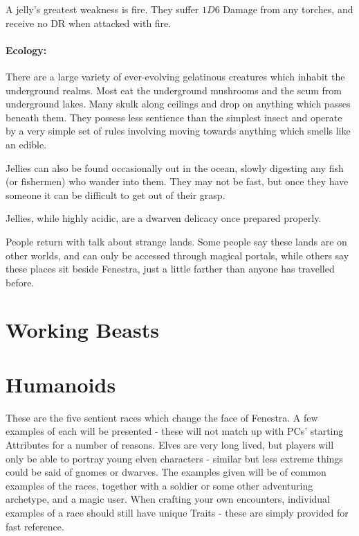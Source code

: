 A jelly's greatest weakness is fire.  They suffer $1D6$ Damage from any torches, and receive no DR when attacked with fire.

\paragraph{Ecology:} There are a large variety of ever-evolving gelatinous creatures which inhabit the underground realms.  Most eat the underground mushrooms and the scum from underground lakes.  Many skulk along ceilings and drop on anything which passes beneath them.  They possess less sentience than the simplest insect and operate by a very simple set of rules involving moving towards anything which smells like an edible.

Jellies can also be found occasionally out in the ocean, slowly digesting any fish (or fishermen) who wander into them.  They may not be fast, but once they have someone it can be difficult to get out of their grasp.

Jellies, while highly acidic, are a dwarven delicacy once prepared properly.

\label{umber_hulk}
\umberhulk

People return with talk about strange lands.  Some people say these lands are on other worlds, and can only be accessed through magical portals, while others say these places sit beside Fenestra, just a little farther than anyone has travelled before.

\section{Working Beasts}

\label{horse} 
\horse

\label{hunting_dogs}
\huntingdog

\label{war_horses}
\section{Humanoids}

These are the five sentient races which change the face of Fenestra.  A few examples of each will be presented - these will not match up with PCs' starting Attributes for a number of reasons.  Elves are very long lived, but players will only be able to portray young elven characters - similar but less extreme things could be said of gnomes or dwarves.  The examples given will be of common examples of the races, together with a soldier or some other adventuring archetype, and a magic user.  When crafting your own encounters, individual examples of a race should still have unique Traits - these are simply provided for fast reference.

